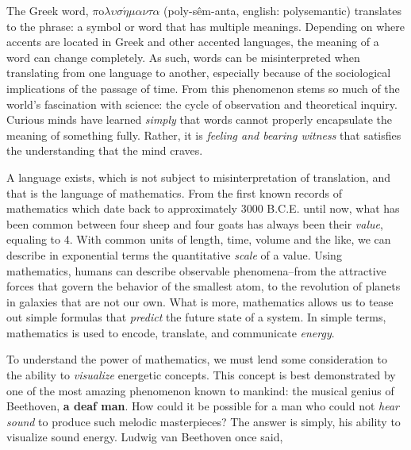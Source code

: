 \documentclass[12pt]{ucsddissertation}
\begin{document}
\mainmatter



\begin{dissertationintroduction}

The Greek word, $\pi$o$\lambda\upsilon\sigma\acute{\eta}\mu\alpha\nu\tau\alpha$ (poly-s\^em-anta, english: polysemantic) translates to the phrase: a symbol or word that has multiple meanings. Depending on where accents are located in Greek and other accented languages, the meaning of a word can change completely. As such, words can be misinterpreted when translating from one language to another, especially because of the sociological implications of the passage of time. From this phenomenon stems so much of the world's fascination with science: the cycle of observation and theoretical inquiry. Curious minds have learned \textit{simply} that words cannot properly encapsulate the meaning of something fully. Rather, it is \textit{feeling and bearing witness} that satisfies the understanding that the mind craves. 

A language exists, which is not subject to misinterpretation of translation, and that is the language of mathematics. From the first known records of mathematics which date back to approximately 3000 B.C.E. until now, what has been common between four sheep and four goats has always been their \textit{value}, equaling to 4. With common units of length, time, volume and the like, we can describe in exponential terms the quantitative \textit{scale} of a value. Using mathematics, humans can describe observable phenomena--from the attractive forces that govern the behavior of the smallest atom, to the revolution of planets in galaxies that are not our own. What is more, mathematics allows us to tease out simple formulas that \textit{predict} the future state of a system. In simple terms, mathematics is used to encode, translate, and communicate \textit{energy}.

To understand the power of mathematics, we must lend some consideration to the ability to \textit{visualize} energetic concepts. This concept is best demonstrated by one of the most amazing phenomenon known to mankind: the musical genius of Beethoven, \textbf{a deaf man}. How could it be possible for a man who could not \textit{\textit{hear sound}} to produce such melodic masterpieces? The answer is simply, his ability to visualize sound energy. Ludwig van Beethoven once said, 


\end{dissertationintroduction}
\end{document}
